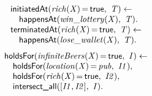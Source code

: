 \documentclass[8pt]{beamer}
\DeclareMathOperator{\val}{=}  %
\def \patsize {}
\def\happensAt{\textsf{\patsize happensAt}}
\def\holdsFor{\textsf{\patsize holdsFor}}
\def\initiatedAt{\textsf{\patsize initiatedAt}}
\def\terminatedAt{\textsf{\patsize terminatedAt}}
\def\intersectall{\textsf{\patsize intersect\_all}}
\def\true{\textsf{\patsize true}}
\newenvironment{mysplit}%
  {\arraycolsep 0pt \begin{array}{l}}%
  {\end{array}}
\begin{document}
\begin{frame}
\begin{minipage}{0.48\linewidth}
        \begin{align*}
            \begin{mysplit}
                \initiatedAt\mathit{(rich(X)\val\true,\ T) \leftarrow}\\
                \quad    \happensAt\mathit{(win\_lottery(X),\ T).}\\
                \terminatedAt\mathit{(rich(X)\val\true,\ T) \leftarrow}\\
                \quad    \happensAt\mathit{(lose\_wallet(X),\ T)}.\\
            \end{mysplit}
        \end{align*}
        \begin{align*}
            \begin{mysplit}
                \holdsFor\mathit{(infiniteBeers(X)\val\true,\ I) \leftarrow}\\
                \quad    \holdsFor\mathit{(location(X)\val pub,\ I1),}\\
                \quad    \holdsFor\mathit{(rich(X)\val\true,\ I2),}\\
                \quad    \intersectall\mathit{([I1,I2],\ I).}\\
            \end{mysplit}
        \end{align*}
    \end{minipage}

\end{frame}
\end{document}
